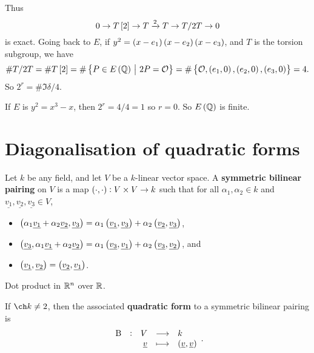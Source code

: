 Thus
$$ 0 \to T\sbr{2} \to T \xrightarrow{2} T \to T / 2T \to 0 $$
is exact. Going back to $ E $, if $ y^2 = \br{x - e_1}\br{x - e_2}\br{x - e_3} $, and $ T $ is the torsion subgroup, we have
$$ \#T / 2T = \#T\sbr{2} = \#\cbr{P \in E\br{\QQ} \st 2P = \OOO} = \#\cbr{\OOO, \br{e_1, 0}, \br{e_2, 0}, \br{e_3, 0}} = 4. $$
So $ 2^r = \#\Im \delta / 4 $.

\begin{example*}
If $ E $ is $ y^2 = x^3 - x $, then $ 2^r = 4 / 4 = 1 $ so $ r = 0 $. So $ E\br{\QQ} $ is finite.
\end{example*}

\pagebreak

\appendix

\section{Diagonalisation of quadratic forms}

\begin{definition}
Let $ k $ be any field, and let $ V $ be a $ k $-linear vector space. A \textbf{symmetric bilinear pairing} on $ V $ is a map $ \br{\cdot, \cdot} : V \times V \to k $ such that for all $ \alpha_1, \alpha_2 \in k $ and $ \underline{v_1}, \underline{v_2}, \underline{v_3} \in V $,
\begin{itemize}
\item $ \br{\alpha_1\underline{v_1} + \alpha_2\underline{v_2}, \underline{v_3}} = \alpha_1\br{\underline{v_1}, \underline{v_3}} + \alpha_2\br{\underline{v_2}, \underline{v_3}} $,
\item $ \br{\underline{v_3}, \alpha_1\underline{v_1} + \alpha_2\underline{v_2}} = \alpha_1\br{\underline{v_3}, \underline{v_1}} + \alpha_2\br{\underline{v_3}, \underline{v_2}} $, and
\item $ \br{\underline{v_1}, \underline{v_2}} = \br{\underline{v_2}, \underline{v_1}} $.
\end{itemize}
\end{definition}

\begin{example}
Dot product in $ \mathbb{R}^n $ over $ \mathbb{R} $.
\end{example}

\begin{definition}
If $ \ch k \ne 2 $, then the associated \textbf{quadratic form} to a symmetric bilinear pairing is
$$ \function[\B]{V}{k}{\underline{v}}{\br{\underline{v}, \underline{v}}}. $$
\end{definition}

